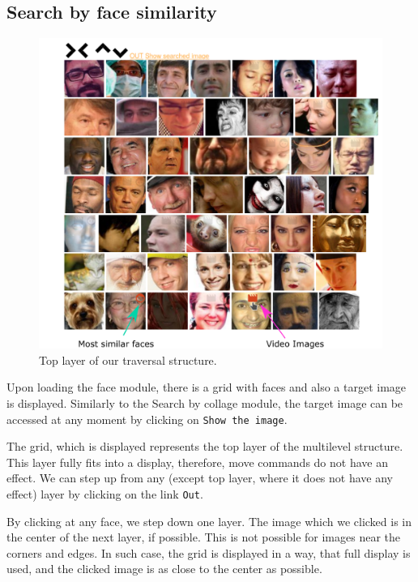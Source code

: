 \subsection{Search by face similarity}

\begin{figure}
    \centering
    \includegraphics[width=\linewidth]{img/face_grid.png}
    \caption{Top layer of our traversal structure.}
    \label{fig:face_grid_app}
\end{figure}

Upon loading the face module, there is a grid with faces and also a target image is displayed. Similarly to the Search by collage module, the target image can be accessed at any moment by clicking on \verb+Show the image+. 

The grid, which is displayed represents the top layer of the multilevel structure. This layer fully fits into a display, therefore, move commands do not have an effect. We can step up from any (except top layer, where it does not have any effect) layer by clicking on the link \verb+Out+.

By clicking at any face, we step down one layer. The image which we clicked is in the center of the next layer, if possible. This is not possible for images near the corners and edges. In such case, the grid is displayed in a way, that full display is used, and the clicked image is as close to the center as possible.

